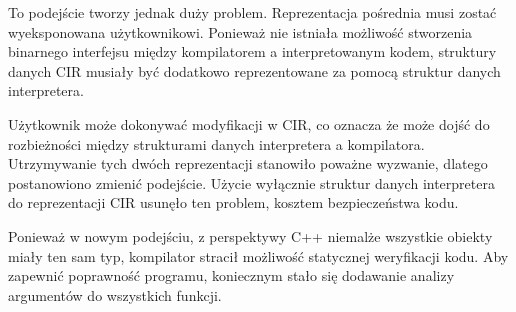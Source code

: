 To podejście tworzy jednak duży problem. Reprezentacja pośrednia musi zostać wyeksponowana użytkownikowi. Ponieważ nie istniała możliwość stworzenia binarnego interfejsu między kompilatorem a interpretowanym kodem, struktury danych CIR musiały być dodatkowo reprezentowane za pomocą struktur danych interpretera.


Użytkownik może dokonywać modyfikacji w CIR, co oznacza że może dojść do rozbieżności między strukturami danych interpretera a kompilatora. Utrzymywanie tych dwóch reprezentacji stanowiło poważne wyzwanie, dlatego postanowiono zmienić podejście. Użycie wyłącznie struktur danych interpretera do reprezentacji CIR usunęło ten problem, kosztem bezpieczeństwa kodu.


Ponieważ w nowym podejściu, z perspektywy C++ niemalże wszystkie obiekty miały ten sam typ, kompilator stracił możliwość statycznej weryfikacji kodu.
Aby zapewnić poprawność programu, koniecznym stało się dodawanie analizy argumentów do wszystkich funkcji.
